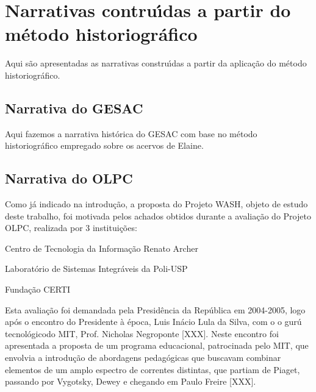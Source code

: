 \documentclass[
12pt,		%
openright,	%
twoside,  %
a4paper,			%
chapter=TITLE,		%
english,			%
french,				%
spanish,			%
brazil				%
]{USPSC-classe/USPSC_RedarTex}
\begin{document}
\section[Narrativas contru\'{\i}das a partir do m\'etodo historiogr\'afico]{Narrativas contru\'{\i}das a partir do m\'etodo historiogr\'afico}\label{Narrativas contru\'{\i}das a partir do m\'etodo historiogr\'afico}
Aqui s\~ao apresentadas as narrativas constru\'{\i}das a partir da aplica\c{c}\~ao do m\'etodo historiogr\'afico.








\subsection[Narrativa do GESAC]{Narrativa do GESAC}\label{Narrativa do GESAC}
Aqui fazemos a narrativa hist\'orica do GESAC com base no m\'etodo historiogr\'afico empregado sobre os acervos de Elaine.








\subsection[Narrativa do OLPC]{Narrativa do OLPC}\label{Narrativa do OLPC}
Como j\'a indicado na introdu\c{c}\~ao, a proposta do Projeto WASH, objeto de estudo deste trabalho, foi motivada pelos achados obtidos durante a avalia\c{c}\~ao do Projeto OLPC, realizada por 3 institui\c{c}\~oes:









\begin{alineas}
\item Centro de Tecnologia da Informa\c{c}\~ao Renato Archer
\item Laborat\'orio de Sistemas Integr\'aveis da Poli-USP
\item Funda\c{c}\~ao CERTI
\end{alineas}

Esta avalia\c{c}\~ao foi demandada pela Presid\^encia da Rep\'ublica em 2004-2005, logo ap\'os o encontro do Presidente \`a \'epoca, Luis In\'acio Lula da Silva, com o o \textquotedbl gur\'u tecnol\'ogico\textquotedbl  do MIT, Prof. Nicholas Negroponte [XXX]. Neste encontro foi apresentada a proposta de um programa educacional, patrocinada pelo MIT, que envolvia a introdu\c{c}\~ao de abordagens pedag\'ogicas que buscavam combinar elementos de um amplo espectro de correntes distintas, que partiam de Piaget, passando por Vygotsky, Dewey e chegando em Paulo Freire [XXX].
\end{document}
